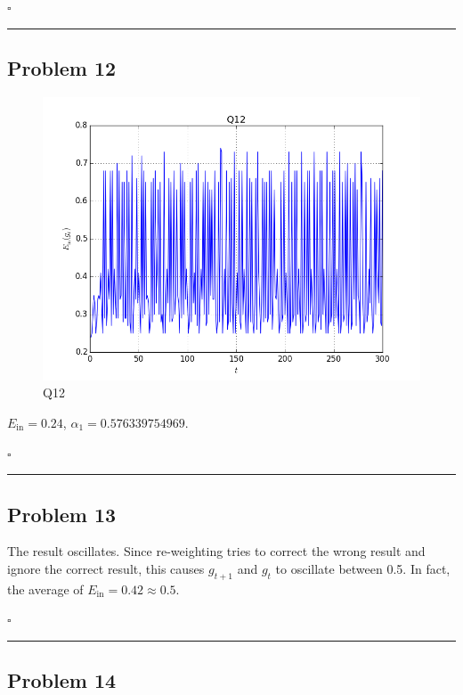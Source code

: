 \documentclass[12pt]{article}
\newcommand*{\QEDB}{\hfill\ensuremath{\square}}
\newcommand{\horrule}[1]{\rule{\linewidth}{#1}}
\begin{document}
\QEDB

\horrule{0.5pt}

\subsection*{Problem 12}

\begin{figure}[H]
	\centering
	\includegraphics[scale=0.5]{Q12.png}
	\caption{Q12}
	\label{Q12}
\end{figure}
$E_{\text{in}}=0.24$, $\alpha_1=0.576339754969$.

\QEDB

\horrule{0.5pt}

\subsection*{Problem 13}

The result oscillates. Since re-weighting tries to correct the wrong result and ignore the correct result, this causes $g_{t+1}$ and $g_t$ to oscillate between 0.5. In fact, the average of $E_{\text{in}}=0.42\approx0.5$.

\QEDB

\horrule{0.5pt}

\subsection*{Problem 14}
\end{document}
